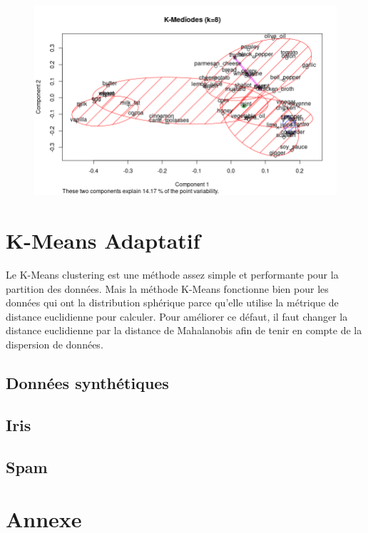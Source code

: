 \documentclass[a4paper, titlepage]{report}
\begin{document}
\begin{figure}[h]
\begin{center}
		\includegraphics[scale = 0.45]{./doc/kmediodes-8.png}
	\end{center}
\end{figure}




\chapter{K-Means Adaptatif}

Le K-Means clustering est une méthode assez simple et performante pour la partition des données. Mais la méthode K-Means fonctionne bien pour les données qui ont la distribution sphérique parce qu'elle utilise la métrique de distance euclidienne pour calculer. Pour améliorer ce défaut, il faut changer la distance euclidienne par la distance de Mahalanobis afin de tenir en compte de la dispersion de données.
\section{Données synthétiques}

\section{Iris}

\section{Spam}



\chapter*{Annexe}

\end{document}
